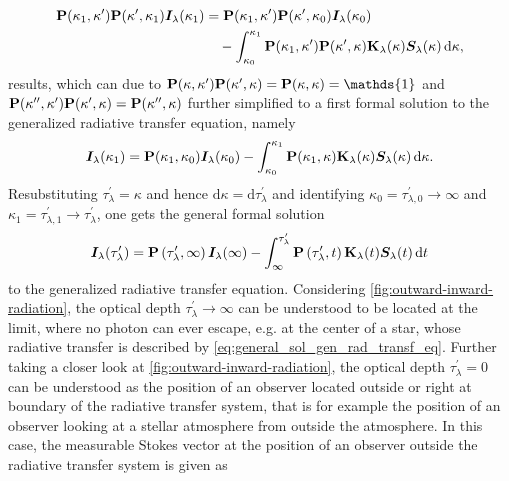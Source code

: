 \documentclass[a4paper,12pt]{report}
\begin{document}
\begin{align}
\begin{aligned}
\boldsymbol{\mathbf{P}}(\kappa_1,\kappa^\prime)\boldsymbol{\mathbf{P}}(\kappa^\prime,\kappa_1)\bm{I}_\lambda(\kappa_1) &= \boldsymbol{\mathbf{P}}(\kappa_1,\kappa^\prime)\boldsymbol{\mathbf{P}}(\kappa^\prime,\kappa_0)\bm{I}_\lambda(\kappa_0) \\
&\quad - \int_{\kappa_0}^{\kappa_1}\boldsymbol{\mathbf{P}}(\kappa_1,\kappa^\prime)\boldsymbol{\mathbf{P}}(\kappa^\prime,\kappa)\boldsymbol{\mathbf{K}}_\lambda(\kappa)\bm{S}_\lambda(\kappa)\,\mathrm{d}\kappa,
\end{aligned}
\end{align} results, which can due to $\matr{P}(\kappa,\kappa^\prime)\matr{P}(\kappa^\prime,\kappa) = \matr{P}(\kappa,\kappa) = \mathds{1}$ and $\boldsymbol{\mathbf{P}}(\kappa^{\prime\prime},\kappa^\prime)\boldsymbol{\mathbf{P}}(\kappa^\prime,\kappa) = \boldsymbol{\mathbf{P}}(\kappa^{\prime\prime},\kappa)$ further simplified to a first formal solution to the generalized radiative transfer equation, namely \begin{equation}
\bm{I}_\lambda(\kappa_1) = \boldsymbol{\mathbf{P}}(\kappa_1,\kappa_0)\bm{I}_\lambda(\kappa_0)- \int_{\kappa_0}^{\kappa_1}\boldsymbol{\mathbf{P}}(\kappa_1,\kappa)\boldsymbol{\mathbf{K}}_\lambda(\kappa)\bm{S}_\lambda(\kappa)\,\mathrm{d}\kappa.
\end{equation} Resubstituting $\tau_\lambda^\prime = \kappa$ and hence $\mathrm{d}\kappa = \mathrm{d}\tau_\lambda^\prime$ and identifying $\kappa_0 = \tau_{\lambda,0}^\prime \rightarrow \infty$ and $\kappa_1 = \tau_{\lambda,1}^\prime\rightarrow \tau_\lambda^\prime$, one gets the general formal solution \begin{align}\begin{aligned}\label{eq:general_sol_gen_rad_transf_eq}
\bm{I}_\lambda(\tau_\lambda^\prime) = \boldsymbol{\mathbf{P}}\left(\tau_\lambda^\prime,\infty\right)\bm{I}_\lambda(\infty)  -\int_{\infty}^{\tau_\lambda^\prime}\boldsymbol{\mathbf{P}}\left(\tau_\lambda^\prime,t\right)\boldsymbol{\mathbf{K}}_\lambda(t)\bm{S}_\lambda(t)\,\mathrm{d}t
\end{aligned}\end{align} to the generalized radiative transfer equation. Considering \cref{fig:outward-inward-radiation}, the optical depth $\tau_\lambda^\prime \rightarrow \infty$ can be understood to be located at the limit, where no photon can ever escape, e.g. at the center of a star, whose radiative transfer is described by \cref{eq:general_sol_gen_rad_transf_eq}. Further taking a closer look at \cref{fig:outward-inward-radiation}, the optical depth $\tau_\lambda^\prime = 0$ can be understood as the position of an observer located outside or right at boundary of the radiative transfer system, that is for example the position of an observer looking at a stellar atmosphere from outside the atmosphere. In this case, the measurable Stokes vector at the position of an observer outside the radiative transfer system is given as \begin{align}\begin{aligned}\label{eq:special_sol_gen_rad_transf_eq}

\end{aligned}
\end{align}
\end{document}
